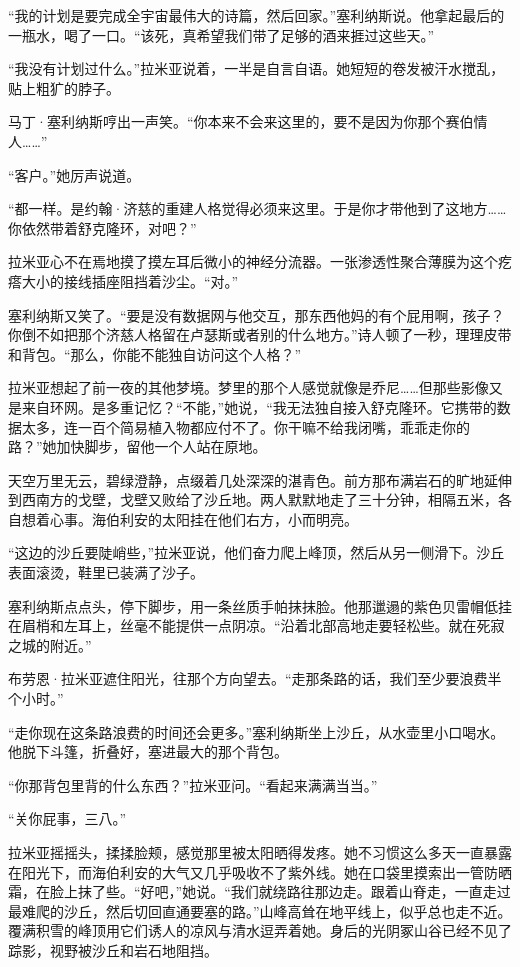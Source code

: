 \documentclass[AutoFakeBold=true]{book}
\begin{document}
``我的计划是要完成全宇宙最伟大的诗篇，然后回家。''塞利纳斯说。他拿起最后的一瓶水，喝了一口。``该死，真希望我们带了足够的酒来捱过这些天。''

``我没有计划过什么。''拉米亚说着，一半是自言自语。她短短的卷发被汗水搅乱，贴上粗犷的脖子。

马丁·塞利纳斯哼出一声笑。``你本来不会来这里的，要不是因为你那个赛伯情人……''

``客户。''她厉声说道。

``都一样。是约翰·济慈的重建人格觉得必须来这里。于是你才带他到了这地方……你依然带着舒克隆环，对吧？''

拉米亚心不在焉地摸了摸左耳后微小的神经分流器。一张渗透性聚合薄膜为这个疙瘩大小的接线插座阻挡着沙尘。``对。''

塞利纳斯又笑了。``要是没有数据网与他交互，那东西他妈的有个屁用啊，孩子？你倒不如把那个济慈人格留在卢瑟斯或者别的什么地方。''诗人顿了一秒，理理皮带和背包。``那么，你能不能独自访问这个人格？''

拉米亚想起了前一夜的其他梦境。梦里的那个人感觉就像是乔尼……但那些影像又是来自环网。{\kaishu 是多重记忆？}``不能，''她说，``我无法独自接入舒克隆环。它携带的数据太多，连一百个简易植入物都应付不了。你干嘛不给我闭嘴，乖乖走你的路？''她加快脚步，留他一个人站在原地。

天空万里无云，碧绿澄静，点缀着几处深深的湛青色。前方那布满岩石的旷地延伸到西南方的戈壁，戈壁又败给了沙丘地。两人默默地走了三十分钟，相隔五米，各自想着心事。海伯利安的太阳挂在他们右方，小而明亮。

``这边的沙丘要陡峭些，''拉米亚说，他们奋力爬上峰顶，然后从另一侧滑下。沙丘表面滚烫，鞋里已装满了沙子。

塞利纳斯点点头，停下脚步，用一条丝质手帕抹抹脸。他那邋遢的紫色贝雷帽低挂在眉梢和左耳上，丝毫不能提供一点阴凉。``沿着北部高地走要轻松些。就在死寂之城的附近。''

布劳恩·拉米亚遮住阳光，往那个方向望去。``走那条路的话，我们至少要浪费半个小时。''

``走你现在这条路浪费的时间还会更多。''塞利纳斯坐上沙丘，从水壶里小口喝水。他脱下斗篷，折叠好，塞进最大的那个背包。

``你那背包里背的什么东西？''拉米亚问。``看起来满满当当。''

``关你屁事，三八。''

拉米亚摇摇头，揉揉脸颊，感觉那里被太阳晒得发疼。她不习惯这么多天一直暴露在阳光下，而海伯利安的大气又几乎吸收不了紫外线。她在口袋里摸索出一管防晒霜，在脸上抹了些。``好吧，''她说。``我们就绕路往那边走。跟着山脊走，一直走过最难爬的沙丘，然后切回直通要塞的路。''山峰高耸在地平线上，似乎总也走不近。覆满积雪的峰顶用它们诱人的凉风与清水逗弄着她。身后的光阴冢山谷已经不见了踪影，视野被沙丘和岩石地阻挡。
\end{document}
